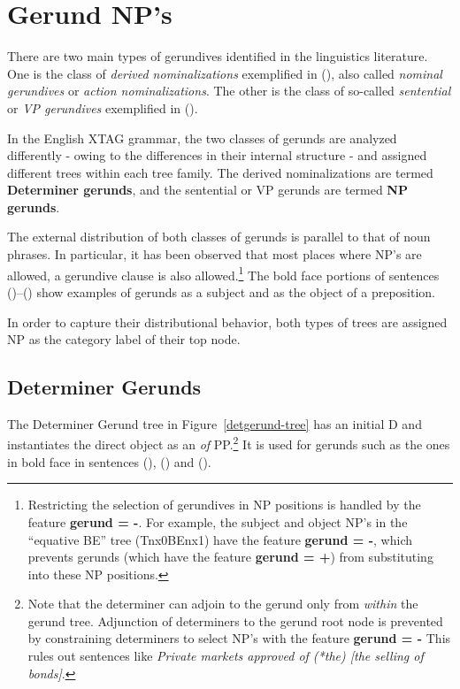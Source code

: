 \chapter{Gerund NP's}
\label{gerunds-chapter}

There are two main types of gerundives identified in the linguistics
literature. One is the class of {\it derived nominalizations} exemplified
in (), also called {\it nominal gerundives} or {\it action
nominalizations}. The other is the class of so-called {\it sentential} or
{\it VP gerundives} exemplified in ().



In the English XTAG grammar, the two classes of gerunds are analyzed
differently - owing to the differences in their internal structure - and
assigned different trees within each tree family. The derived
nominalizations are termed {\bf Determiner gerunds}, and the sentential or
VP gerunds are termed {\bf NP gerunds}.

The external distribution of both classes of gerunds is parallel to that of
noun phrases. In particular, it has been observed that most places where
NP's are allowed, a gerundive clause is also allowed.\footnote{Restricting
the selection of gerundives in NP positions is handled by the feature {\bf
gerund = -}. For example, the subject and object NP's in the ``equative
BE'' tree (Tnx0BEnx1) have the feature {\bf gerund = -}, which prevents
gerunds (which have the feature {\bf gerund = +}) from substituting into
these NP positions.} The bold face portions of sentences ()--()
show examples of gerunds as a subject and as the object of a preposition.





In order to capture their distributional behavior, both types of trees are
assigned NP as the category label of their top node.

\section{Determiner Gerunds}
The Determiner Gerund tree in Figure~\ref{detgerund-tree} has an initial D
and instantiates the direct object as an {\it of} PP.\footnote{Note that
the determiner can adjoin to the gerund only from {\it within} the gerund
tree. Adjunction of determiners to the gerund root node is prevented by
constraining determiners to select NP's with the feature {\bf gerund = -}
This rules out sentences like {\it Private markets approved of (*the) [the
selling of bonds]}.} It is used for gerunds such as the ones in bold face
in sentences (), () and ().

